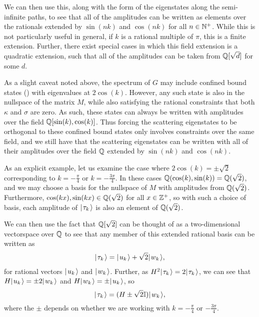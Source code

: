\documentclass[../thesis-main/thesis-main]{subfiles}
\begin{document}
We can then use this, along with the form of the eigenstates along the semi-infinite paths, to see that all of the amplitudes can be written as elements over the rationals extended by $\sin(nk)$ and $\cos(nk)$ for all $n\in \mathbb{N}^+$.  While this is not particularly useful in general, if $k$ is a rational multiple of $\pi$, this is a finite extension.  Further, there exist special cases in which this field extension is a quadratic extension, such that all of the amplitudes can be taken from $\mathbb{Q}[\sqrt{d}]$ for some $d$.

As a slight caveat noted above, the spectrum of $G$ may include confined bound states () with eigenvalues at $2\cos(k)$.  However, any such state is also in the nullspace of the matrix $M$, while also satisfying the rational constraints that both $\kappa$ and $\sigma$ are zero.  As such, these states can always be written with amplitudes over the field $\mathbb{Q}[\sin(k),\cos(k)]$.  Thus forcing the scattering eigenstates to be orthogonal to these confined bound states only involves constraints over the same field, and we still have that the scattering eigenstates can be written with all of their amplitudes over the field $\mathbb{Q}$ extended by $\sin(nk)$ and $\cos(nk)$.

As an explicit example, let us examine the case where $2\cos(k)=\pm\sqrt{2}$ corresponding to $k = -\frac{\pi}{4}$ or $k = -\frac{3\pi}{4}$.  In these cases $\mathbb{Q}(\cos(k),\sin(k)) = \mathbb{Q}(\sqrt{2})$, and we may choose a basis for the nullspace of $M$ with amplitudes from $\mathbb{Q}(\sqrt{2})$. Furthermore, $\cos(kx), \sin(kx) \in \mathbb{Q}(\sqrt{2})$ for all $x\in \mathbb{Z}^+$, so with such a choice of basis, each amplitude of $|\mspace{2mu} \tau_k \mspace{2mu} \rangle$ is also an element of $\mathbb{Q}(\sqrt{2})$.

We can then use the fact that $\mathbb{Q}[\sqrt{2}]$ can be thought of as a two-dimensional vectorspace over $\mathbb{Q}$ to see that any member of this extended rational basis can be written as 
\begin{align}
  |\mspace{2mu} \tau_k \mspace{2mu} \rangle = |\mspace{2mu} u_k \mspace{2mu} \rangle + \sqrt{2} |\mspace{2mu} w_k \mspace{2mu} \rangle,
\end{align}
for rational vectors $|\mspace{2mu} u_k \mspace{2mu} \rangle$ and $|\mspace{2mu} w_k \mspace{2mu} \rangle$.  Further, as $H^2 |\mspace{2mu} \tau_k \mspace{2mu} \rangle = 2 |\mspace{2mu} \tau_k \mspace{2mu} \rangle$, we can see that  $H|\mspace{2mu} u_k \mspace{2mu} \rangle=\pm 2|\mspace{2mu} w_k \mspace{2mu} \rangle$ and $H|\mspace{2mu} w_k \mspace{2mu} \rangle = \pm |\mspace{2mu} u_k \mspace{2mu} \rangle$, so
\begin{equation}
  |\mspace{2mu} \tau_k \mspace{2mu} \rangle=(H \pm \sqrt{2} \mathbb{I})|\mspace{2mu} w_k \mspace{2mu} \rangle,\label{eq:form_of_tau}
\end{equation}
where the $\pm$ depends on whether we are working with $k = -\frac{\pi}{4}$ or $-\frac{3\pi}{4}$.
\end{document}
